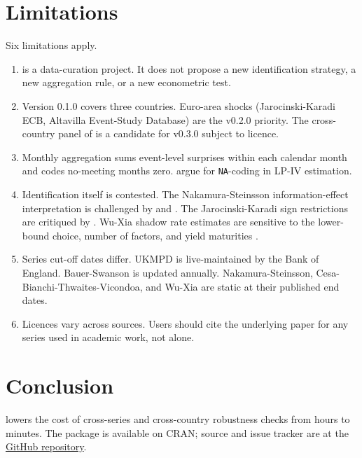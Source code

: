 \section{Limitations}\label{limitations}

Six limitations apply.

\begin{enumerate}
\def\labelenumi{\arabic{enumi}.}
\tightlist
\item
   is a data-curation project. It does not propose a new identification strategy, a new aggregation rule, or a new econometric test.
\item
  Version 0.1.0 covers three countries. Euro-area shocks (Jarocinski-Karadi ECB, Altavilla Event-Study Database) are the v0.2.0 priority. The cross-country panel of \citet{bolhuis2024new} is a candidate for v0.3.0 subject to licence.
\item
  Monthly aggregation sums event-level surprises within each calendar month and codes no-meeting months zero. \citet{bu2021unified} argue for \texttt{NA}-coding in LP-IV estimation.
\item
  Identification itself is contested. The Nakamura-Steinsson information-effect interpretation is challenged by \citet{bauer2023alternative} and \citet{miranda2021transmission}. The Jarocinski-Karadi sign restrictions are critiqued by \citet{acosta2023perceived}. Wu-Xia shadow rate estimates are sensitive to the lower-bound choice, number of factors, and yield maturities \citep{krippner2020comparison}.
\item
  Series cut-off dates differ. UKMPD is live-maintained by the Bank of England. Bauer-Swanson is updated annually. Nakamura-Steinsson, Cesa-Bianchi-Thwaites-Vicondoa, and Wu-Xia are static at their published end dates.
\item
  Licences vary across sources. Users should cite the underlying paper for any series used in academic work, not  alone.
\end{enumerate}

\section{Conclusion}\label{conclusion}

 lowers the cost of cross-series and cross-country robustness checks from hours to minutes. The package is available on CRAN; source and issue tracker are at the \href{https://github.com/charlescoverdale/mpshock}{GitHub repository}.

